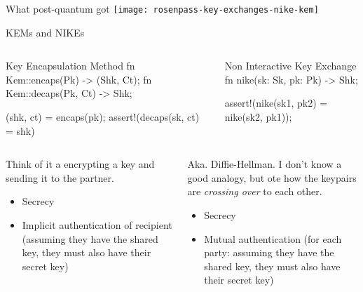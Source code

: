 \begin{frame}{What post-quantum got}
  \texttt{[image: rosenpass-key-exchanges-nike-kem]}
\end{frame}



\begin{frame}[fragile,T]{KEMs and NIKEs}
  \begin{columns}[t,fullwidth]
    \begin{column}{.48\linewidth}
\begin{rustblock}{Key Encapsulation Method}
fn Kem::encaps(Pk) -> (Shk, Ct);
fn Kem::decaps(Pk, Ct) -> Shk;

(shk, ct) = encaps(pk);
assert!(decaps(sk, ct) = shk)
\end{rustblock}
\end{column}\hfill
\begin{column}{.49\linewidth}
\begin{rustblock}{Non Interactive Key Exchange}
fn nike(sk: Sk, pk: Pk) -> Shk;

assert!(nike(sk1, pk2) = nike(sk2, pk1));
\end{rustblock}
\end{column}
\end{columns}\hfill
\begin{columns}[t,fullwidth]
\begin{column}{.48\linewidth}
  Think of it a encrypting a key and sending it
        to the partner.

        \begin{itemize}
          \item Secrecy
          \item Implicit authentication of recipient
            (assuming they have the shared key, they must
            also have their secret key)
        \end{itemize}
\end{column}\hfill
\begin{column}{.48\linewidth}
        Aka. Diffie-Hellman.
        I don't know a good analogy, but ote how the
        keypairs are \emph{crossing over} to each other.

        \begin{itemize}
          \item Secrecy
          \item Mutual authentication
            (for each party: assuming they have the shared key, they must
            also have their secret key)
        \end{itemize}
    \end{column}
  \end{columns}
\end{frame}


